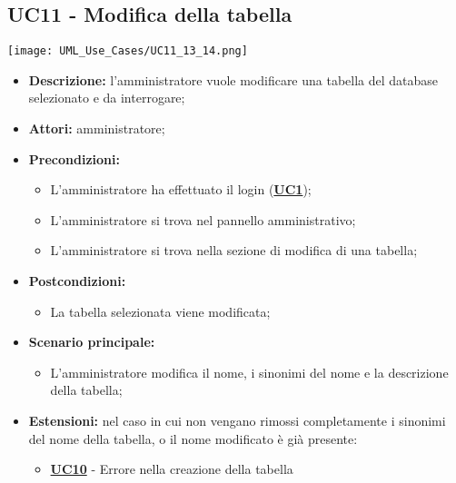 \subsection{UC11 - Modifica della tabella}
\label{sec:UC11}
\texttt{[image: UML\_Use\_Cases/UC11\_13\_14.png]}
\begin{itemize}
	\item \textbf{Descrizione:} l’amministratore vuole modificare una tabella del database selezionato e da interrogare;
	\item \textbf{Attori:} amministratore;
	\item \textbf{Precondizioni:} 
	\begin{itemize}
		\item L’amministratore ha effettuato il login (\hyperref[sec:UC1]{\textbf{UC1}});
		\item L’amministratore si trova nel pannello amministrativo;
		\item L’amministratore si trova nella sezione di modifica di una tabella;
	\end{itemize}
	\item \textbf{Postcondizioni:} 
	\begin{itemize}
		\item La tabella selezionata viene modificata;
	\end{itemize}
	\item \textbf{Scenario principale:} 
	\begin{itemize}
		\item L’amministratore modifica il nome, i sinonimi del nome e la descrizione della tabella;
	\end{itemize}
	\item \textbf{Estensioni:} nel caso in cui non vengano rimossi completamente i sinonimi del nome della tabella, o il nome modificato è già presente:
	\begin{itemize}
		\item \hyperref[sec:UC10]{\textbf{UC10}} - Errore nella creazione della tabella
	\end{itemize}
\end{itemize}


